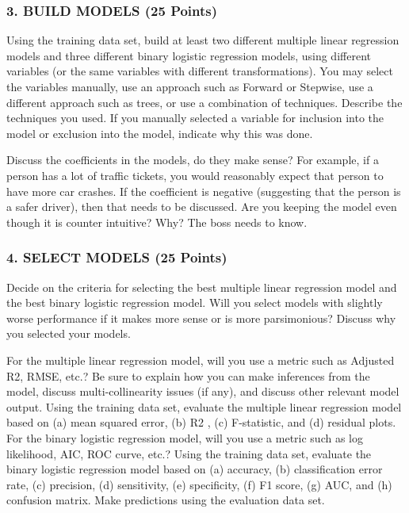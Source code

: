 \documentclass[
]{article}
\begin{document}
\hypertarget{build-models-25-points}{%
\subsubsection{3. BUILD MODELS (25
Points)}\label{build-models-25-points}}

Using the training data set, build at least two different multiple
linear regression models and three different binary logistic regression
models, using different variables (or the same variables with different
transformations). You may select the variables manually, use an approach
such as Forward or Stepwise, use a different approach such as trees, or
use a combination of techniques. Describe the techniques you used. If
you manually selected a variable for inclusion into the model or
exclusion into the model, indicate why this was done.

Discuss the coefficients in the models, do they make sense? For example,
if a person has a lot of traffic tickets, you would reasonably expect
that person to have more car crashes. If the coefficient is negative
(suggesting that the person is a safer driver), then that needs to be
discussed. Are you keeping the model even though it is counter
intuitive? Why? The boss needs to know.

\hypertarget{select-models-25-points}{%
\subsubsection{4. SELECT MODELS (25
Points)}\label{select-models-25-points}}

Decide on the criteria for selecting the best multiple linear regression
model and the best binary logistic regression model. Will you select
models with slightly worse performance if it makes more sense or is more
parsimonious? Discuss why you selected your models.

For the multiple linear regression model, will you use a metric such as
Adjusted R2, RMSE, etc.? Be sure to explain how you can make inferences
from the model, discuss multi-collinearity issues (if any), and discuss
other relevant model output. Using the training data set, evaluate the
multiple linear regression model based on (a) mean squared error, (b) R2
, (c) F-statistic, and (d) residual plots. For the binary logistic
regression model, will you use a metric such as log likelihood, AIC, ROC
curve, etc.? Using the training data set, evaluate the binary logistic
regression model based on (a) accuracy, (b) classification error rate,
(c) precision, (d) sensitivity, (e) specificity, (f) F1 score, (g) AUC,
and (h) confusion matrix. Make predictions using the evaluation data
set.
\end{document}
